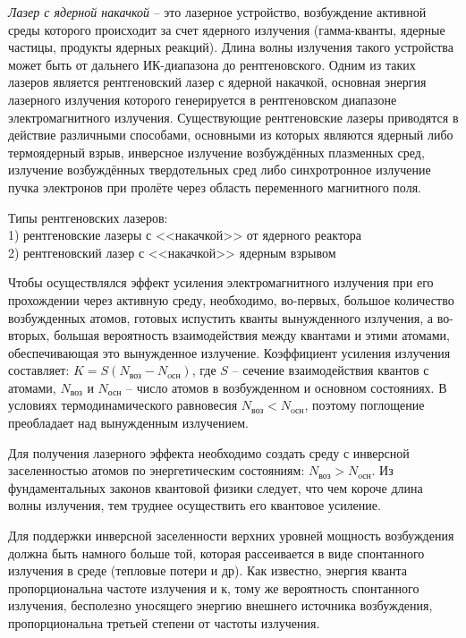 
\emph{Лазер с ядерной накачкой} -- это лазерное устройство, возбуждение 
активной среды которого происходит за счет ядерного излучения (гамма-кванты, 
ядерные частицы, продукты ядерных реакций). Длина волны излучения такого 
устройства может быть от дальнего ИК-диапазона до рентгеновского. Одним из 
таких лазеров является рентгеновский лазер с ядерной накачкой, основная 
энергия лазерного излучения которого генерируется в рентгеновском диапазоне 
электромагнитного излучения. Существующие рентгеновские лазеры приводятся в 
действие различными способами, основными из которых являются ядерный либо 
термоядерный взрыв, инверсное излучение возбуждённых плазменных сред, 
излучение возбуждённых твердотельных сред либо синхротронное излучение пучка 
электронов при пролёте через область переменного магнитного поля.

Типы рентгеновских лазеров: \\
1) рентгеновские лазеры с <<накачкой>> от ядерного реактора \\
2) рентгеновский лазер с <<накачкой>> ядерным взрывом

Чтобы осуществлялся эффект усиления электромагнитного излучения при его 
прохождении через активную среду, необходимо, во-первых, большое количество 
возбужденных атомов, готовых испустить кванты вынужденного излучения, а 
во-вторых, большая вероятность взаимодействия между квантами и этими атомами, 
обеспечивающая это вынужденное излучение. Коэффициент усиления излучения 
составляет: \( K = S(N_\text{воз} - N_\text{oсн}) \), где \( S \) -- сечение 
взаимодействия квантов с атомами, \( N_\text{воз} \) и \( N_\text{осн} \) -- 
число атомов в возбужденном и основном состояниях. В условиях 
термодинамического равновесия \( N_\text{воз} < N_\text{oсн} \), поэтому 
поглощение преобладает над вынужденным излучением.

Для получения лазерного эффекта необходимо создать среду с инверсной 
заселенностью атомов по энергетическим состояниям: 
\( N_\text{воз} > N_\text{oсн} \). Из фундаментальных законов квантовой физики 
следует, что чем короче длина волны излучения, тем труднее осуществить его 
квантовое усиление.

Для поддержки инверсной заселенности верхних уровней мощность возбуждения 
должна быть намного больше той, которая рассеивается в виде спонтанного 
излучения в среде (тепловые потери и др). Как известно, энергия кванта 
пропорциональна частоте излучения и к, тому же вероятность спонтанного 
излучения, бесполезно уносящего энергию внешнего источника возбуждения, 
пропорциональна третьей степени от частоты излучения. 

